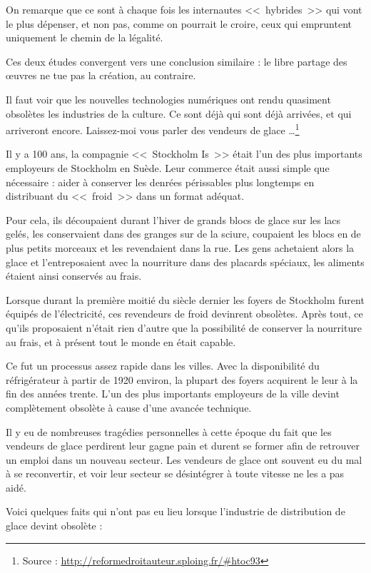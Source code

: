 On remarque que ce sont à chaque fois les internautes <<~hybrides~>> qui vont le plus dépenser, et non pas, comme on pourrait le croire, ceux qui empruntent uniquement le chemin de la légalité.

Ces deux études convergent vers une conclusion similaire : le libre partage des œuvres ne tue pas la création, au contraire.

Il faut voir que les nouvelles technologies numériques ont rendu quasiment obsolètes les industries de la culture.
Ce sont déjà qui sont déjà arrivées, et qui arriveront encore.
Laissez-moi vous parler des vendeurs de glace \dots{}\footnote{Source : \url{http://reformedroitauteur.sploing.fr/\#htoc93}}

Il y a 100 ans, la compagnie <<~Stockholm Is~>> était l'un des plus importants employeurs de Stockholm en Suède. Leur commerce était aussi simple que nécessaire : aider à conserver les denrées périssables plus longtemps en distribuant du <<~froid~>> dans un format adéquat.

Pour cela, ils découpaient durant l'hiver de grands blocs de glace sur les lacs gelés, les conservaient dans des granges sur de la sciure, coupaient les blocs en de plus petits morceaux et les revendaient dans la rue. Les gens achetaient alors la glace et l'entreposaient avec la nourriture dans des placards spéciaux, les aliments étaient ainsi conservés au frais.

Lorsque durant la première moitié du siècle dernier les foyers de Stockholm furent équipés de l'électricité, ces revendeurs de froid devinrent obsolètes. Après tout, ce qu'ils proposaient n'était rien d'autre que la possibilité de conserver la nourriture au frais, et à présent tout le monde en était capable.

Ce fut un processus assez rapide dans les villes. Avec la disponibilité du réfrigérateur à partir de 1920 environ, la plupart des foyers acquirent le leur à la fin des années trente. L'un des plus importants employeurs de la ville devint complètement obsolète à cause d'une avancée technique.

Il y eu de nombreuses tragédies personnelles à cette époque du fait que les vendeurs de glace perdirent leur gagne pain et durent se former afin de retrouver un emploi dans un nouveau secteur. Les vendeurs de glace ont souvent eu du mal à se reconvertir, et voir leur secteur se désintégrer à toute vitesse ne les a pas aidé.

Voici quelques faits qui n'ont pas eu lieu lorsque l'industrie de distribution de glace devint obsolète :

